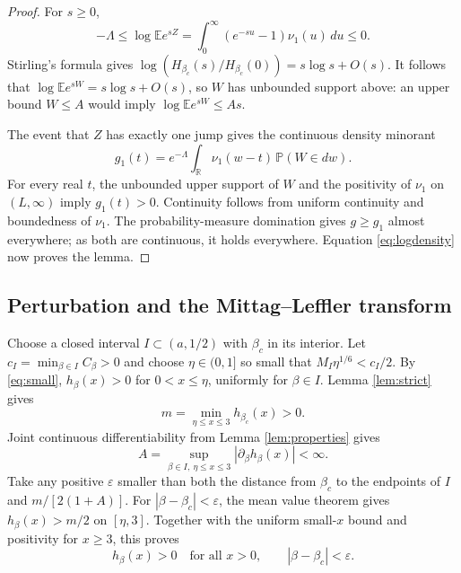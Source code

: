 \documentclass[11pt]{article}
\newcommand{\E}{\mathbb E}
\newcommand{\R}{\mathbb R}
\begin{document}
\begin{proof}
For $s\geq0$,
\[
 -\Lambda\leq\log\E e^{sZ}
 =\int_0^\infty(e^{-su}-1)\nu_1(u)\,du\leq0.
\]
Stirling's formula gives
$\log(H_{\beta_c}(s)/H_{\beta_c}(0))=s\log s+O(s)$.
It follows that $\log\E e^{sW}=s\log s+O(s)$, so $W$ has unbounded
support above: an upper bound $W\leq A$ would imply
$\log\E e^{sW}\leq As$.

The event that $Z$ has exactly one jump gives the continuous density
minorant
\[
 g_1(t)=e^{-\Lambda}\int_{\R}\nu_1(w-t)\,\mathbb P(W\in dw).
\]
For every real $t$, the unbounded upper support of $W$ and the positivity
of $\nu_1$ on $(L,\infty)$ imply $g_1(t)>0$.
Continuity follows from uniform continuity and boundedness of $\nu_1$.
The probability-measure domination gives $g\geq g_1$ almost everywhere;
as both are continuous, it holds everywhere.
Equation \eqref{eq:logdensity} now proves the lemma.
\end{proof}

\subsection*{Perturbation and the Mittag--Leffler transform}
Choose a closed interval $I\subset(a,1/2)$ with $\beta_c$ in its interior.
Let $c_I=\min_{\beta\in I} C_\beta>0$ and choose $\eta\in(0,1]$ so small
that $M_I\eta^{1/6}<c_I/2$. By \eqref{eq:small},
$h_\beta(x)>0$ for $0<x\leq\eta$, uniformly for $\beta\in I$.
Lemma \ref{lem:strict} gives
\[
 m=\min_{\eta\leq x\leq3}h_{\beta_c}(x)>0.
\]
Joint continuous differentiability from Lemma \ref{lem:properties} gives
\[
 A=\sup_{\beta\in I,\ \eta\leq x\leq3}
                |\partial_\beta h_\beta(x)|<\infty.
\]
Take any positive $\varepsilon$ smaller than both the distance from
$\beta_c$ to the endpoints of $I$ and $m/[2(1+A)]$.
For $|\beta-\beta_c|<\varepsilon$, the mean value theorem gives
$h_\beta(x)>m/2$ on $[\eta,3]$. Together with the uniform small-$x$
bound and positivity for $x\geq3$, this proves
\begin{equation}\label{eq:perturbed}
 h_\beta(x)>0\quad\text{for all }x>0,
 \qquad |\beta-\beta_c|<\varepsilon.
\end{equation}
\end{document}
